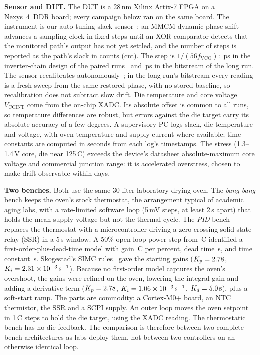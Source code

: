 \documentclass[10pt,twocolumn]{article}
\newcommand{\degC}{\,\textdegree C}
\newcommand{\unit}[1]{\,\mathrm{#1}}
\begin{document}
\textbf{Sensor and DUT.} The DUT is a 28\,nm Xilinx Artix-7 FPGA on a Nexys~4~DDR board; every campaign below ran on the same board. The instrument is our auto-tuning slack sensor~\cite{sbcci25}: an MMCM dynamic phase shift advances a sampling clock in fixed steps until an XOR comparator detects that the monitored path's output has not yet settled, and the number of steps is reported as the path's slack in counts (cnt). The step is $1/(56f_{\mathrm{VCO}})$: \vPsINV\,ps in the inverter-chain design of the paired runs~\cite{sbcci26} and \vPsRCA\,ps in the bitstream of the long run. The sensor recalibrates autonomously~\cite{sbcci25}; in the long run's bitstream every reading is a fresh sweep from the same restored phase, with no stored baseline, so recalibration does not subtract slow drift. Die temperature and core voltage $V_{\mathrm{CCINT}}$ come from the on-chip XADC. Its absolute offset is common to all runs, so temperature differences are robust, but errors against the die target carry its absolute accuracy of a few degrees. A supervisory PC logs slack, die temperature and voltage, with oven temperature and supply current where available; time constants are computed in seconds from each log's timestamps. The stress (1.3--1.4\,V core, die near 125\degC) exceeds the device's datasheet absolute-maximum core voltage and commercial junction range: it is accelerated overstress, chosen to make drift observable within days.

\textbf{Two benches.} Both use the same 30-liter laboratory drying oven. The \emph{bang-bang} bench keeps the oven's stock thermostat, the arrangement typical of academic aging labs, with a rate-limited software loop (5\,mV steps, at least 2\,s apart) that holds the mean supply voltage but not the thermal cycle. The \emph{PID} bench replaces the thermostat with a microcontroller driving a zero-crossing solid-state relay (SSR) in a 5\,s window. A 50\% open-loop power step from \vFopdtTzero\degC{} identified a first-order-plus-dead-time model with gain \vFopdtK\degC{} per percent, dead time \vFopdtTheta\,s, and time constant \vFopdtTau\,s. Skogestad's SIMC rules~\cite{simc} gave the starting gains ($K_p=2.78$, $K_i=\vSimcKiE\times10^{-3}\unit{s^{-1}}$). Because no first-order model captures the oven's overshoot, the gains were refined on the oven, lowering the integral gain and adding a derivative term ($K_p=2.78$, $K_i=\vFinalKiE\times10^{-3}\unit{s^{-1}}$, $K_d=\vFinalKd\unit{s}$), plus a soft-start ramp. The parts are commodity: a Cortex-M0+ board, an NTC thermistor, the SSR and a SCPI supply. An outer loop moves the oven setpoint in 1\degC{} steps to hold the die target, using the XADC reading. The thermostatic bench has no die feedback. The comparison is therefore between two complete bench architectures as labs deploy them, not between two controllers on an otherwise identical loop.
\end{document}
